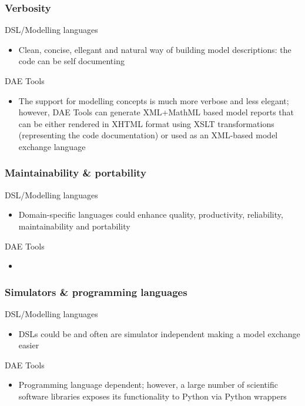 \documentclass{beamer}
\begin{document}
\begin{frame}
\frametitle{Verbosity}
\begin{block}{\textcolor{light_green}{DSL/Modelling languages}}
\begin{itemize}
  \item Clean, concise, ellegant and natural way of building model descriptions: the code can be self documenting
\end{itemize}
\end{block}

\begin{block}{\textcolor{light_red}{DAE Tools}}
\begin{itemize}
  \item The support for modelling concepts is much more verbose and less elegant; however, DAE Tools can generate XML+MathML
	based model reports that can be either rendered in XHTML format using XSLT transformations (representing the code documentation)
	or used as an XML-based model exchange language
\end{itemize}
\end{block}
\end{frame}

\begin{frame}
\frametitle{Maintainability \& portability}
\begin{block}{\textcolor{light_green}{DSL/Modelling languages}}
\begin{itemize}
  \item Domain-specific languages could enhance quality, productivity, reliability, maintainability and portability
\end{itemize}
\end{block}

\begin{block}{\textcolor{light_red}{DAE Tools}}
\begin{itemize}
  \item 
\end{itemize}
\end{block}
\end{frame}

\begin{frame}
\frametitle{Simulators \& programming languages}
\begin{block}{\textcolor{light_green}{DSL/Modelling languages}}
\begin{itemize}
  \item DSLs could be and often are simulator independent making a model exchange easier
\end{itemize}
\end{block}

\begin{block}{\textcolor{light_red}{DAE Tools}}
\begin{itemize}
  \item Programming language dependent; however, a large number of scientific software libraries exposes its functionality
        to Python via Python wrappers
\end{itemize}
\end{block}
\end{frame}
\end{document}
